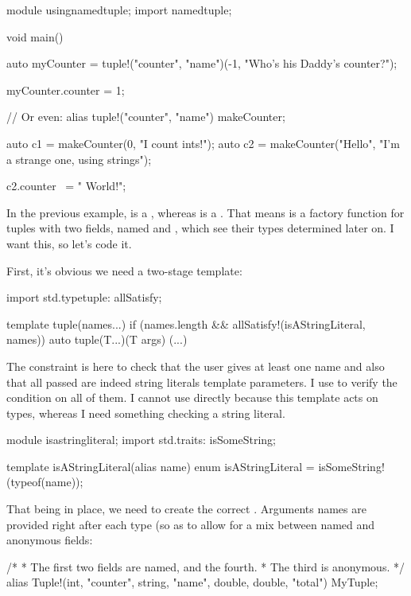 \begin{dcode}
module usingnamedtuple;
import namedtuple;

void main()
{
    auto myCounter = tuple!("counter", "name")(-1, "Who's his Daddy's counter?");

    myCounter.counter = 1;

    // Or even:
    alias tuple!("counter", "name") makeCounter;

    auto c1 = makeCounter(0, "I count ints!");
    auto c2 = makeCounter("Hello", "I'm a strange one, using strings");

    c2.counter ~= " World!"; 
}
\end{dcode}

In the previous example,  is a \DD{,}\DD{)}, whereas  is a \DD{,}\DD{)}. That means  is a factory function for tuples with two fields, named  and , which see their types determined later on. I want this, so let's code it.

First, it's obvious we need a two-stage template:

\begin{dcode}
import std.typetuple: allSatisfy;

template tuple(names...) 
if (names.length && allSatisfy!(isAStringLiteral, names))
{
    auto tuple(T...)(T args)
    {
    (...)
    }
}
\end{dcode}

The constraint is here to check that the user gives at least one name and also that all passed  are indeed string literals template parameters. I use  to verify the condition on all of them. I cannot use directly  because this template acts on types, whereas I need something checking a string literal.

\begin{dcode}
module isastringliteral;
import std.traits: isSomeString;

template isAStringLiteral(alias name)
{
    enum isAStringLiteral = isSomeString!(typeof(name));
}
\end{dcode}

That being in place, we need to create the correct . Arguments names are provided right after each type (so as to allow for a mix between named and anonymous fields:

\begin{dcode}
/*
 * The first two fields are named, and the fourth.
 * The third is anonymous.
 */
alias Tuple!(int, "counter", string, "name", double, double, "total") MyTuple;
\end{dcode}

